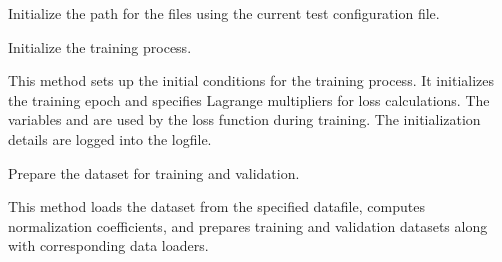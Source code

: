 \documentclass[letterpaper,10pt,english]{sphinxmanual}
\begin{document}
\begin{fulllineitems}
\begin{fulllineitems}
\begin{description}
\end{description}

\end{fulllineitems}


\begin{fulllineitems}
\label{\detokenize{MainTrainer:MainTrainer.MainTrainer.init_files_path}}
\pysigstartsignatures
{}
\pysigstopsignatures
\sphinxAtStartPar
Initialize the path for the files using the current test configuration file.

\end{fulllineitems}


\begin{fulllineitems}
\label{\detokenize{MainTrainer:MainTrainer.MainTrainer.init_training}}
\pysigstartsignatures
{}
\pysigstopsignatures
\sphinxAtStartPar
Initialize the training process.
\begin{description}
\sphinxAtStartPar
This method sets up the initial conditions for the training process.
It initializes the training epoch and specifies Lagrange multipliers for loss calculations.
The variables  and  are used by the loss function during training.
The initialization details are logged into the logfile.

\end{description}

\end{fulllineitems}


\begin{fulllineitems}
\label{\detokenize{MainTrainer:MainTrainer.MainTrainer.prepare_dataset}}
\pysigstartsignatures
{}
\pysigstopsignatures
\sphinxAtStartPar
Prepare the dataset for training and validation.
\begin{description}
\sphinxAtStartPar
This method loads the dataset from the specified datafile, computes normalization coefficients,
and prepares training and validation datasets along with corresponding data loaders.


\end{description}
\end{fulllineitems}
\end{fulllineitems}
\end{document}

